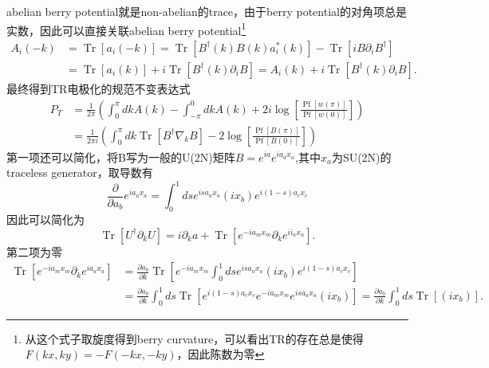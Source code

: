 \documentclass[10pt,openany]{book}
\theoremstyle{thmstyle} %
\theoremstyle{defstyle} %
\theoremstyle{prostyle} %
\begin{document}
abelian berry potential就是non-abelian的trace，由于berry potential的对角项总是实数，因此可以直接关联abelian berry potential\footnote{从这个式子取旋度得到berry curvature，可以看出TR的存在总是使得$F(kx,ky)=-F(-kx,-ky)$，因此陈数为零}
\begin{equation}
  \begin{aligned}
    A_i(-k) & =\operatorname{Tr}\left[a_i(-k)\right]=\operatorname{Tr}\left[B^{\dagger}(k) B(k) a_i^*(k)\right]-\operatorname{Tr}\left[i B \partial_i B^{\dagger}\right] \\
    & =\operatorname{Tr}\left[a_i(k)\right]+i \operatorname{Tr}\left[B^{\dagger}(k) \partial_i B\right]=A_i(k)+i \operatorname{Tr}\left[B^{\dagger}(k) \partial_i B\right] .
    \end{aligned}
\end{equation}
最终得到TR电极化的规范不变表达式
\begin{equation}
  \begin{aligned}
    P_T & =\frac{1}{2 \pi}\left(\int_0^\pi d k A(k)-\int_{-\pi}^0 d k A(k)+2 i \log \left[\frac{\operatorname{Pf}[w(\pi)]}{\operatorname{Pf}[w(0)]}\right]\right) \\
    & =\frac{1}{2 \pi i}\left(\int_0^\pi d k \operatorname{Tr}\left[B^{\dagger} \nabla_k B\right]-2 \log \left[\frac{\operatorname{Pf}[B(\pi)]}{\operatorname{Pf}[B(0)]}\right]\right)
    \end{aligned}
\end{equation}
第一项还可以简化，将B写为一般的U(2N)矩阵$B=e^{i a} e^{i a_a x_a}$,其中$x_a$为SU(2N)的traceless generator，取导数有
\begin{equation*}
  \frac{\partial}{\partial a_b} e^{i a_a x_a}=\int_0^1 d s e^{i s a_a x_a}\left(i x_b\right) e^{i(1-s) a_c x_c}
\end{equation*}
因此可以简化为
\begin{equation}
  \operatorname{Tr}\left[U^{\dagger} \partial_k U\right]=i \partial_k a+\operatorname{Tr}\left[e^{-i a_m x_m} \partial_k e^{i i_a x_a}\right] .
\end{equation}
第二项为零
\begin{equation*}
  \begin{aligned}
    \operatorname{Tr}\left[e^{-i a_m x_m} \partial_k e^{i a_a x_a}\right] & =\frac{\partial a_b}{\partial k} \operatorname{Tr}\left[e^{-i a_m x_m} \int_0^1 d s e^{i s a_a x_a}\left(i x_b\right) e^{i(1-s) a_c x_c}\right] \\
    & =\frac{\partial a_b}{\partial k} \int_0^1 d s \operatorname{Tr}\left[e^{i(1-s) a_c x_c} e^{-i a_m x_m} e^{i s a_a x_a}\left(i x_b\right)\right]=\frac{\partial a_b}{\partial k} \int_0^1 d s \operatorname{Tr}\left[\left(i x_b\right)\right] .
    \end{aligned}
\end{equation*}
\end{document}

